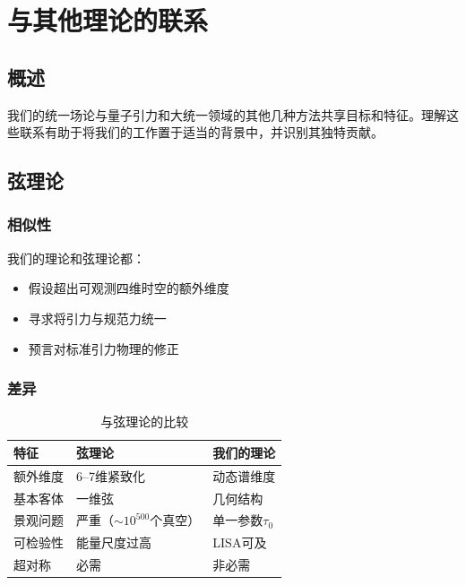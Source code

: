 \section{与其他理论的联系}
\label{sec:connections}

\subsection{概述}

我们的统一场论与量子引力和大统一领域的其他几种方法共享目标和特征。理解这些联系有助于将我们的工作置于适当的背景中，并识别其独特贡献。

\subsection{弦理论}

\subsubsection{相似性}

我们的理论和弦理论都：
\begin{itemize}
    \item 假设超出可观测四维时空的额外维度
    \item 寻求将引力与规范力统一
    \item 预言对标准引力物理的修正
\end{itemize}

\subsubsection{差异}

\begin{table}[htbp]
\centering
\caption{与弦理论的比较}
\label{tab:string_comparison}
\begin{tabular}{p{4cm}p{4cm}p{4cm}}
\hline
\textbf{特征} & \textbf{弦理论} & \textbf{我们的理论} \\
\hline
额外维度 & 6--7维紧致化 & 动态谱维度 \\
基本客体 & 一维弦 & 几何结构 \\
景观问题 & 严重（$\sim 10^{500}$个真空） & 单一参数$\tau_0$ \\
可检验性 & 能量尺度过高 & LISA可及 \\
超对称 & 必需 & 非必需 \\
\hline
\end{tabular}
\end{table}

